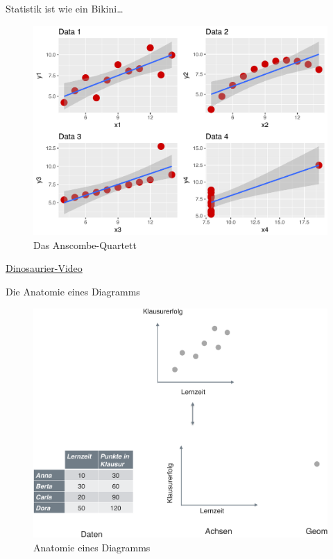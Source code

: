 \begin{frame}{Statistik ist wie ein Bikini\ldots{}}

\begin{figure}

{\centering \includegraphics[width=0.5\linewidth]{../images/visualisieren/anscombe} 

}

\caption{Das Anscombe-Quartett}\label{fig:fig-anscombe}
\end{figure}

\href{https://youtu.be/DbJyPELmhJc}{Dinosaurier-Video}

\end{frame}

\begin{frame}{Die Anatomie eines Diagramms}

\begin{figure}

{\centering \includegraphics[width=0.5\linewidth]{../images/visualisieren/anatomie_diagramm_crop} 

}

\caption{Anatomie eines Diagramms}\label{fig:fig-anatomie}
\end{figure}

\end{frame}


